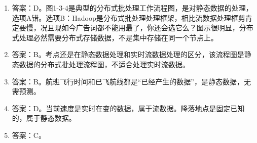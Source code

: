 \begin{enumerate}
\item 答案：D。图1-3-4是典型的分布式批处理工作流程图，是对静态数据的处理，选项A错。选项B：Hadoop是分布式批处理处理框架，相比流数据处理框剪肯定要慢，况且现如今广告词都不能用最了，你还会选它么？图示很明显，分布式处理必然需要分布式存储数据，不是集中存储在同一个节点上。

\item 答案：B。考点还是在静态数据处理和实时流数据处理的区分，该流程图是静态数据的分布式批处理流程图，不适合处理实时流数据。

\item 答案：B。航班飞行时间和已飞航线都是“已经产生的数据”，是静态数据，无需预测。

\item 答案：D。当前速度是实时在变的数据，属于流数据。降落地点是固定已知的，属于静态数据。

\item 答案：C。


\end{enumerate}
